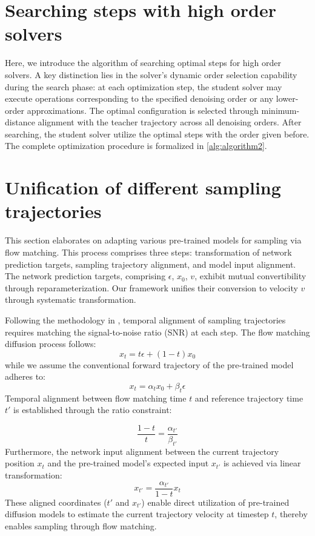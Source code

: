 \documentclass[10pt,twocolumn,letterpaper]{article}
\begin{document}
 \section{Searching steps with high order solvers} \label{sec:high_order}
    Here, we introduce the algorithm of searching optimal steps for high order solvers. A key distinction lies in the solver's dynamic order selection capability during the search phase: at each optimization step, the student solver may execute operations corresponding to the specified denoising order or any lower-order approximations. The optimal configuration is selected through minimum-distance alignment with the teacher trajectory across all denoising orders. After searching, the student solver utilize the optimal steps with the order given before. The complete optimization procedure is formalized in \cref{alg:algorithm2}.
   

 

    
 \section{Unification of different sampling trajectories}\label{sec:unify}
    This section elaborates on adapting various pre-trained models for sampling via flow matching. This process comprises three steps: transformation of network prediction targets, sampling trajectory alignment, and model input alignment. 
    The network prediction targets, comprising $\epsilon$, $x_0$, $v$, exhibit mutual convertibility through reparameterization. Our framework unifies their conversion to velocity $v$ through systematic transformation.
    
    Following the methodology in \cite{improverectifiedflow}, temporal alignment of sampling trajectories requires matching the signal-to-noise ratio (SNR) at each step. The flow matching diffusion process follows:
    \begin{equation}
        x_t = t\epsilon+(1-t)x_0
    \end{equation}
    while we assume the conventional forward trajectory of the pre-trained model adheres to:
    \begin{equation}
        x_t = \alpha_tx_0+\beta_t\epsilon
    \end{equation}
    Temporal alignment between flow matching time $t$ and reference trajectory time $t'$ is established through the ratio constraint:
  
    \begin{equation}
        \frac{1-t}{t} = \frac{\alpha_{t'}}{\beta_{t'}}
    \end{equation}
    Furthermore, the network input alignment between the current trajectory position $x_t$ and the pre-trained model's expected input $x_{t'}$ is achieved via linear transformation:
    \begin{equation}
        x_{t'} = \frac{\alpha_{t'}}{1-t}x_t
    \end{equation}
    These aligned coordinates ($t'$ and $x_{t'}$) enable direct utilization of pre-trained diffusion models to estimate the current trajectory velocity at timestep $t$, thereby enables sampling through flow matching.
\end{document}

